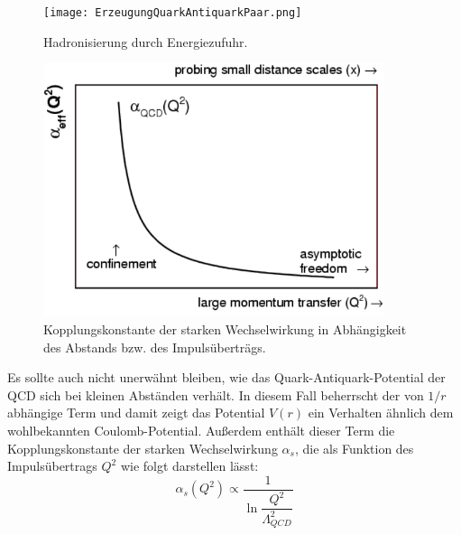 \documentclass[12pt,a4paper]{report}
\begin{document}
\begin{figure}
\centering
\texttt{[image: ErzeugungQuarkAntiquarkPaar.png]}  
\caption{Hadronisierung durch Energiezufuhr.}
\label{Hadronisierung}
\end{figure}

\begin{figure}
\centering
\includegraphics[width=10cm]{KoppKonst.png} 
\caption{Kopplungskonstante der starken Wechselwirkung in Abhängigkeit des Abstands bzw. des Impulsüberträgs.}
\label{KoppKonst}
\end{figure}
Es sollte auch nicht unerwähnt bleiben, wie das Quark-Antiquark-Potential der QCD sich bei kleinen Abständen verhält. In diesem Fall beherrscht der von $1/r$ abhängige Term und damit zeigt das Potential $V(r)$ ein Verhalten ähnlich dem wohlbekannten Coulomb-Potential. Außerdem enthält dieser Term die Kopplungskonstante der starken Wechselwirkung $\alpha_{s}$, die als Funktion des Impulsübertrags $Q^{2}$ wie folgt darstellen lässt:\\
\begin{equation} \label{eq:KoppKonstante}
  \alpha_{s}(Q^{2})\propto\dfrac{1}{\ln{\dfrac{Q^{2}}{\Lambda_{QCD}^{2}}}}
\end{equation}
\end{document}
